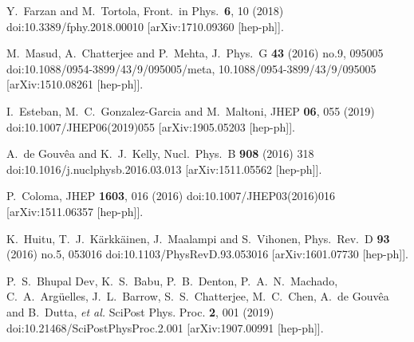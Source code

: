 \begin{thebibliography}{00}
  Y.~Farzan and M.~Tortola,
  Front.\ in Phys.\  {\bf 6}, 10 (2018)
  doi:10.3389/fphy.2018.00010
  [arXiv:1710.09360 [hep-ph]].
  

  M.~Masud, A.~Chatterjee and P.~Mehta,
  J.\ Phys.\ G {\bf 43} (2016) no.9,  095005
  doi:10.1088/0954-3899/43/9/095005/meta, 10.1088/0954-3899/43/9/095005
  [arXiv:1510.08261 [hep-ph]].
  
I.~Esteban, M.~C.~Gonzalez-Garcia and M.~Maltoni,
JHEP \textbf{06}, 055 (2019)
doi:10.1007/JHEP06(2019)055
[arXiv:1905.05203 [hep-ph]].
  
  A.~de Gouv\^ea and K.~J.~Kelly,
  Nucl.\ Phys.\ B {\bf 908} (2016) 318
  doi:10.1016/j.nuclphysb.2016.03.013
  [arXiv:1511.05562 [hep-ph]].

  
  P.~Coloma,
  JHEP {\bf 1603}, 016 (2016)
  doi:10.1007/JHEP03(2016)016
  [arXiv:1511.06357 [hep-ph]].


  K.~Huitu, T.~J.~K{\"a}rkk{\"a}inen, J.~Maalampi and S.~Vihonen,
  Phys.\ Rev.\ D {\bf 93} (2016) no.5,  053016
  doi:10.1103/PhysRevD.93.053016
  [arXiv:1601.07730 [hep-ph]].
  
P.~S.~Bhupal Dev, K.~S.~Babu, P.~B.~Denton, P.~A.~N.~Machado, C.~A.~Arg\"uelles, J.~L.~Barrow, S.~S.~Chatterjee, M.~C.~Chen, A.~de Gouv\^ea and B.~Dutta, \textit{et al.}
SciPost Phys. Proc. \textbf{2}, 001 (2019)
doi:10.21468/SciPostPhysProc.2.001
[arXiv:1907.00991 [hep-ph]].
  

\end{thebibliography}
